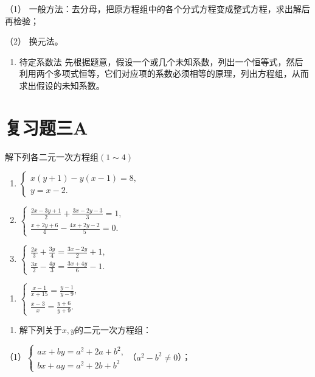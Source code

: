 （1）
一般方法：去分母，把原方程组中的各个分式方程变成整式方程，求出解后再检验；

（2） 换元法。

\begin{enumerate}[start=6]
\item
  待定系数法
  先根据题意，假设一个或几个未知系数，列出一个恒等式，然后利用两个多项式恒等，它们对应项的系数必须相等的原理，列出方程组，从而求出假设的未知系数。
\end{enumerate}

\section{复习题三A}

解下列各二元一次方程组\((1\sim 4)\)

\begin{enumerate}[start=1]
\item
  \(\left\{ \begin{array}{l} x(y + 1) - y(x - 1) = 8, \\ y = x - 2. \end{array} \right.\)
\item
  \(\left\{ \begin{array}{l} \frac{2x - 3y + 1}{2} + \frac{3x - 2y - 3}{3} = 1, \\ \frac{x + 2y + 6}{4} - \frac{4x + 2y - 2}{5} = 0. \end{array} \right.\)
\item
  \(\left\{ \begin{array}{l} \frac{2x}{3} + \frac{3y}{4} = \frac{3x - 2y}{2} + 1, \\ \frac{3x}{2} - \frac{4y}{3} = \frac{3x + 4y}{6} - 1. \end{array} \right.\)
\end{enumerate}
\begin{enumerate}[start=4]
\item
  \(\left\{ \begin{array}{l} \frac{x - 1}{x + 15} = \frac{y - 1}{y - 9}, \\ \frac{x - 3}{x} = \frac{y + 6}{y + 9}. \end{array} \right.\)
\end{enumerate}

\begin{enumerate}[start=5]
\item
  解下列关于\(x, y\)的二元一次方程组：
\end{enumerate}

（1）\(\left\{ \begin{array}{l} ax + by = a^2 + 2a + b^2, \\ bx + ay = a^2 + 2b + b^2 \end{array} \right.\)（\(a^2 - b^2 \neq 0\)）；

